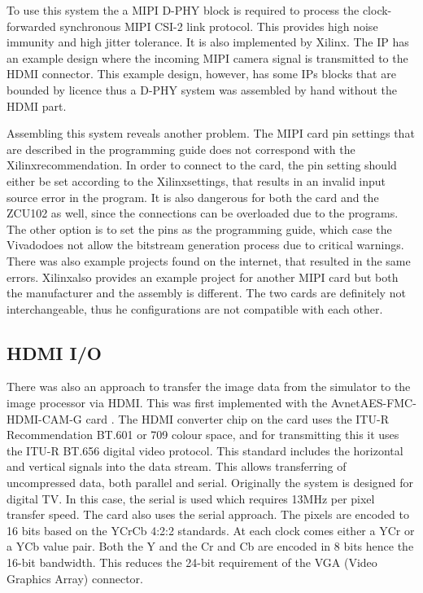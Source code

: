 To use this system the a MIPI D-PHY block is required to process the clock-forwarded synchronous MIPI CSI-2 link protocol.
This provides high noise immunity and high jitter tolerance.
It is also implemented by Xilinx.
The IP has an example design where the incoming MIPI camera signal is transmitted to the HDMI connector.
This example design, however, has some IPs blocks that are bounded by licence thus a D-PHY system was assembled by hand without the HDMI part.

Assembling this system reveals another problem.
The MIPI card pin settings that are described in the programming guide does not correspond with the Xilinx\texttrademark recommendation.
In order to connect to the card, the pin setting should either be set according to the Xilinx\texttrademark settings, that results in an invalid input source error in the program.
It is also dangerous for both the card and the ZCU102 as well, since the connections can be overloaded due to the programs.
The other option is to set the pins as the programming guide, which case the Vivado\texttrademark does not allow the bitstream generation process due to critical warnings.
There was also example projects found on the internet, that resulted in the same errors.
Xilinx\texttrademark also provides an example project for another MIPI card but both the manufacturer and the assembly is different.
The two cards are definitely not interchangeable, thus he configurations are not compatible with each other.

\subsection{HDMI I/O} %
There was also an approach to transfer the image data from the simulator to the image processor via HDMI.
This was first implemented with the Avnet\texttrademark AES-FMC-HDMI-CAM-G card \cite{avnet_HDMI}.
The HDMI converter chip on the card uses the ITU-R Recommendation BT.601 or 709 colour space, and for transmitting this it uses the ITU-R BT.656 digital video protocol.
This standard includes the horizontal and vertical signals into the data stream.
This allows transferring of uncompressed data, both parallel and serial.
Originally the system is designed for digital TV.
In this case, the serial is used which requires 13MHz per pixel transfer speed.
The card also uses the serial approach.
The pixels are encoded to 16 bits based on the YCrCb 4:2:2 standards.
At each clock comes either a YCr or a YCb value pair.
Both the Y and the Cr and Cb are encoded in 8 bits hence the 16-bit bandwidth.
This reduces the 24-bit requirement of the VGA (Video Graphics Array) connector.

